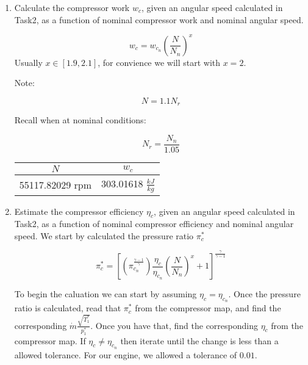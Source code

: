 \documentclass[titlepage]{article}
\begin{document}
\begin{enumerate}
  \item Calculate the compressor work $w_{c}$, given an angular speed calculated
  in Task2, as a function of nominal compressor work and nominal angular speed.

  \begin{equation}
    w_{c} = w_{c_{n}} \left( \frac{N}{N_{n}} \right)^{x}
  \end{equation}
  Usually $x \in [1.9, 2.1]$, for convience we will start with $x = 2$.

  Note: 

  \begin{equation}
    N = 1.1N_{r}
  \end{equation}

  Recall when at nominal conditions:

  \begin{equation}
    N_{r} = \frac{N_{n}}{1.05}
  \end{equation}

  \begin{center}
    \begin{tabular}{|c|c|}
      \hline
      $N$ & $w_{c}$ \\
      \hline
      55117.82029 rpm & 303.01618 $\frac{kJ}{kg}$ \\
      \hline
    \end{tabular}
  \end{center}

  \item Estimate the compressor efficiency $\eta_{c}$, given an angular 
  speed calculated in Task2, as a function of nominal compressor efficiency and
  nominal angular speed. We start by calculated the pressure ratio $\pi_{c}^{*}$

  \begin{equation}
    \pi_{c}^{*} = \left[ \left(\pi_{c_{n}}^{\frac{\gamma-1}{\gamma}}\right)
    \frac{\eta_{c}}{\eta_{c_{n}}} \left(\frac{N}{N_{n}}\right)^{x} +1 \right]^{\frac{\gamma}{\gamma-1}}
  \end{equation}

  To begin the caluation we can start by assuming $\eta_{c} = \eta_{c_{n}}$. Once
  the pressure ratio is calculated, read that $\pi_{c}^{*}$ from the compressor map, 
  and find the corresponding $\dot{m}\frac{\sqrt{T_{1}^{*}}}{p_{1}^{*}}$. Once you have 
  that, find the corresponding $\eta_{c}$ from the compressor map. If $\eta_{c} \neq \eta_{c_{n}}$ 
  then iterate until the change is less than a allowed tolerance. For our engine,
  we allowed a tolerance of $0.01$.


\end{enumerate}
\end{document}
